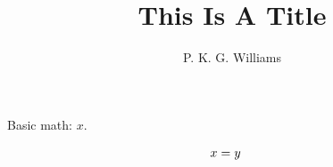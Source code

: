 \documentclass{article}
\title{This Is A Title}
\author{P. K. G. Williams}
\begin{document}
Basic math: $x$.

\WEBTEXtraceon \begin{align}
x &= y \cr
\end{align}
\end{document}
